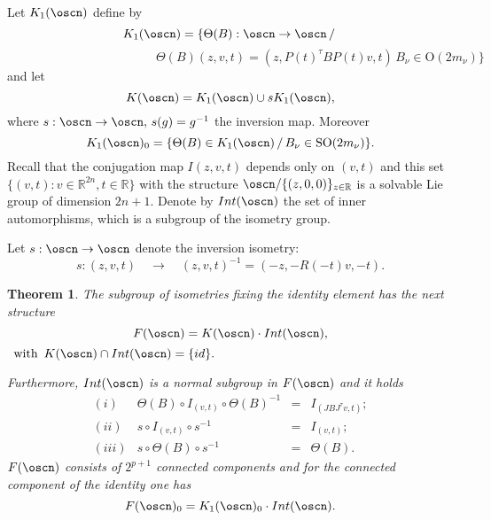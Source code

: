 \documentclass[12pt]{amsart}
\theoremstyle{plain}
\newtheorem{thm}{Theorem}[section]
\theoremstyle{definition}
\theoremstyle{remark}
\begin{document}
Let $K_1(\oscn)$ define by
$$K_1(\oscn)=\{\Theta(B):\oscn \to \oscn \,  /\,$$
$$\qquad \qquad \qquad  \qquad \qquad \qquad \Theta(B)(z,v,t)=(z,P(t)^{\tau}BP(t)v,t)\, B_{\nu}\in\mathrm{O}(2m_{\nu})\}$$
and let $$K(\oscn)=K_1(\oscn)\cup sK_1(\oscn),$$
where $s:\oscn \to \oscn, \, s(g)=g^{-1}$ the inversion map.
Moreover 
$$K_1(\oscn)_0=\{\Theta(B)\in K_1(\oscn)\,/\, B_{\nu}\in \mathrm{SO}(2m_{\nu})\}.$$
Recall that the conjugation map $I{(z,v,t)}$ depends only on $(v,t)$ and this set $\{(v,t): v \in \mathbb R^{2n}, t\in \mathbb R\}$ with the structure $\oscn/\{(z,0,0)\}_{z\in\mathbb R}$ is a solvable Lie group of dimension $2n+1$. Denote by $Int(\oscn)$ the set of inner automorphisms, which is a subgroup of the isometry group. 

Let $s:\oscn \to \oscn$ denote the inversion  isometry:
$$s: (z,v,t) \quad \to \quad (z,v,t)^{-1}=(-z, -R(-t)v,-t).$$

    \begin{thm}\cite{Bou} \label{Bou}
        The subgroup of isometries fixing the identity element has the next structure
        $$F(\oscn)=K(\oscn)\cdot 
       Int(\oscn),$$
       $ \, \mbox{ with  }\, K(\oscn)\cap Int(\oscn)=\{id\}.$
        
        Furthermore, $Int(\oscn)$ is a normal subgroup in $F(\oscn)$ and it holds
    $$ \begin{array}{crcl}
        	(i) & \Theta(B)\circ I_{(v,t)}\circ \Theta(B)^{-1} & = &I_{(JBJ^{\tau}v,t)};\\  	
        
        	(ii) & s\circ I_{(v,t)}\circ s^{-1} & = & I_{(v,t)};\\
        
        (iii) & s \circ \Theta(B) \circ s^{-1} &   = & \Theta(B).
        \end{array}$$
  $F(\oscn)$ consists of $2^{p+1}$ connected components and for the connected component of the identity one has
  $$F(\oscn)_0=K_1(\oscn)_0\cdot Int(\oscn).$$
        \end{thm}
\end{document}
